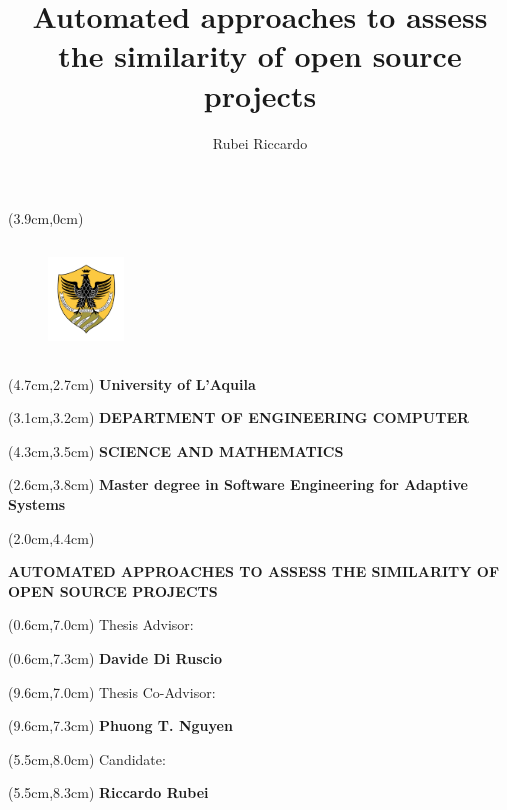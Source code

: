 \documentclass{beamer}
\author{Rubei Riccardo}
\title{Automated approaches to assess the similarity of open source projects}
\begin{document}
\begin{frame}%
\begin{textblock*}{5cm}(3.9cm,0cm)
	\begin{figure}[!h]
	\includegraphics[width=2cm,height=3cm,keepaspectratio]{images/Logo.png}
	\centering
	\label{fig:Logo}
	\end{figure}
\end{textblock*}

\begin{textblock*}{5cm}(4.7cm,2.7cm)
\textbf{\small University of L'Aquila}
\end{textblock*}

\begin{textblock*}{10cm}(3.1cm,3.2cm)
\textbf{\scriptsize DEPARTMENT OF ENGINEERING COMPUTER}
\end{textblock*}

\begin{textblock*}{10cm}(4.3cm,3.5cm)
\textbf{\scriptsize SCIENCE AND MATHEMATICS}
\end{textblock*}

\begin{textblock*}{10cm}(2.6cm,3.8cm)
\textbf{\scriptsize Master degree in Software Engineering for Adaptive Systems}
\end{textblock*}

\begin{textblock*}{9cm}(2.0cm,4.4cm)
\begin{center}
\textbf{\scriptsize AUTOMATED APPROACHES TO ASSESS THE SIMILARITY
OF OPEN SOURCE PROJECTS}
\end{center}
\end{textblock*}

\begin{textblock*}{2cm}(0.6cm,7.0cm)
\scriptsize Thesis Advisor:
\end{textblock*}
\begin{textblock*}{5cm}(0.6cm,7.3cm)
\textbf{\scriptsize Davide Di Ruscio}
\end{textblock*}

\begin{textblock*}{2.5cm}(9.6cm,7.0cm)
\scriptsize Thesis Co-Advisor:
\end{textblock*}
\begin{textblock*}{5cm}(9.6cm,7.3cm)
\textbf{\scriptsize Phuong T. Nguyen}
\end{textblock*}

\begin{textblock*}{2.5cm}(5.5cm,8.0cm)
\scriptsize Candidate:
\end{textblock*}
\begin{textblock*}{5cm}(5.5cm,8.3cm)
\textbf{\scriptsize Riccardo Rubei}
\end{textblock*}

\end{frame}
\end{document}
